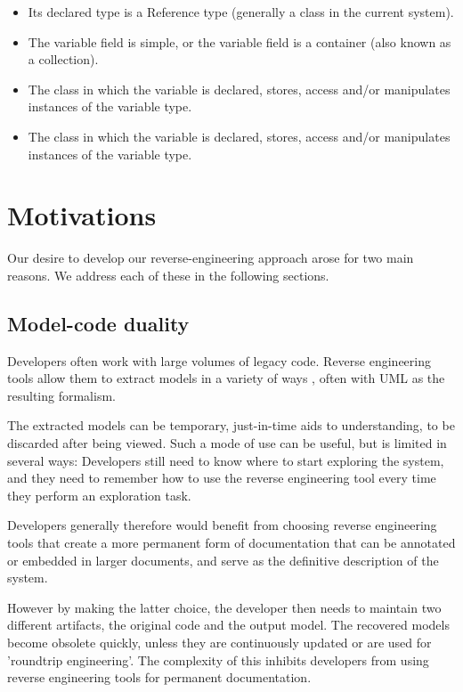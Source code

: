 \begin{itemize}
\item Its declared type is a Reference type (generally a class in the current system).
\item The variable field is simple, or the variable field is a container (also known as a collection).
\item The class in which the variable is declared, stores, access and/or manipulates instances of the variable type.
\item The class in which the variable is declared, stores, access and/or manipulates instances of the variable type.
\end{itemize}


\section{Motivations}

Our desire to develop our reverse-engineering approach arose for two main reasons. We address each of these in the following sections.

\subsection{Model-code duality}

Developers often work with large volumes of legacy code. Reverse engineering tools allow them to extract models in a variety of ways \cite{OsmanChaudron}, often with UML as the resulting formalism.

The extracted models can be temporary, just-in-time aids to understanding, to be discarded after being viewed. Such a mode of use can be useful, but is limited in several ways: Developers still need to know where to start exploring the system, and they need to remember how to use the reverse engineering tool every time they perform an exploration task. 

Developers generally therefore would benefit from choosing reverse engineering tools that create a more permanent form of documentation that can be annotated or embedded in larger documents, and serve as the definitive description of the system. 

However by making the latter choice, the developer then needs to maintain two different artifacts, the original code and the output model. The recovered models become obsolete quickly, unless they are continuously updated or are used for 'roundtrip engineering'.  The complexity of this inhibits developers from using reverse engineering tools for permanent documentation.

